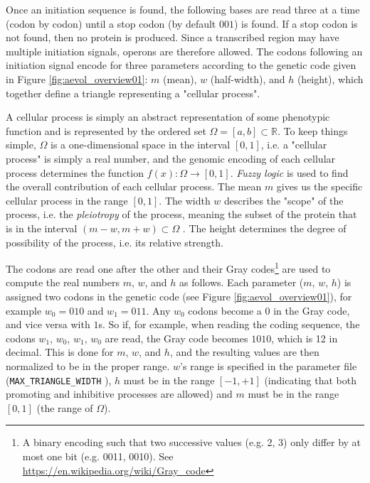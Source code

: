 Once an initiation sequence is found, the following bases are read three at a time (codon by codon) until a stop codon (by default $001$) is found. If a stop codon is not found, then no protein is produced. Since a transcribed region may have multiple initiation signals, operons are therefore allowed. The codons following an initiation signal encode for three parameters according to the genetic code given in Figure \ref{fig:aevol_overview01}: $m$ (mean), $w$ (half-width), and $h$ (height), which together define a triangle representing a "cellular process".

A cellular process is simply an abstract representation of some phenotypic function and is represented by the ordered set $\Omega = \left[ a,b \right] \subset \mathbb{R}$. To keep things simple, $\Omega$ is a one-dimensional space in the interval $\left[0,1\right]$, i.e. a "cellular process" is simply a real number, and the genomic encoding of each cellular process determines the function $f(x) : \Omega \rightarrow \left[0,1\right]$. \textit{Fuzzy logic} is used to find the overall contribution of each cellular process.  The mean $m$ gives us the specific cellular process in the range $\left[0,1\right]$. The width $w$ describes the "scope" of the process, i.e. the \textit{pleiotropy} of the process, meaning the subset of the protein that is in the interval $ \left(m - w, m + w\right) \subset \Omega$ . The height determines the degree of possibility of the process, i.e. its relative strength.

The codons are read one after the other and their Gray codes\footnote{A binary encoding such that two successive values (e.g. 2, 3) only differ by at most one bit (e.g. 0011, 0010). See \url{https://en.wikipedia.org/wiki/Gray_code}} are used to compute the real numbers $m$, $w$, and $h$ as follows. Each parameter ($m$, $w$, $h$) is assigned two codons in the genetic code (see Figure \ref{fig:aevol_overview01}), for example $w_0 = 010$ and $w_1 = 011$. Any $w_0$ codons become a $0$ in the Gray code, and vice versa with $1$s. So if, for example, when reading the coding sequence, the codons $w_1$, $w_0$, $w_1$, $w_0$ are read, the Gray code becomes $1010$, which is 12 in decimal. This is done for $m$, $w$, and $h$, and the resulting values are then normalized to be in the proper range. $w$'s range is specified in the parameter file (\texttt{MAX\_TRIANGLE\_WIDTH} ), $h$ must be in the range $\left[-1,+1\right]$ (indicating that both promoting and inhibitive processes are allowed) and $m$ must be in the range $\left[0,1\right]$ (the range of $\Omega$). 

